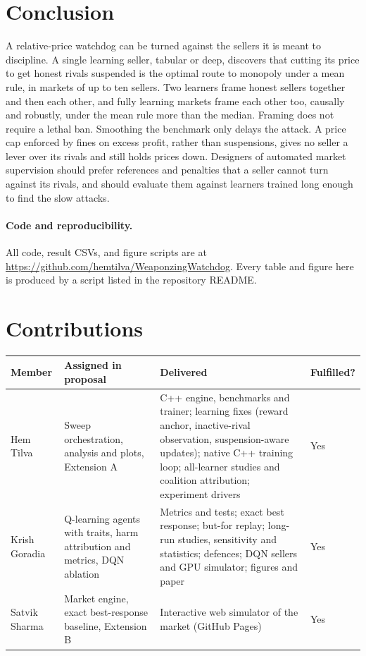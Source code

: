 \documentclass{article}
\begin{document}
\section{Conclusion}
A relative-price watchdog can be turned against the sellers it is meant to discipline. A single learning seller, tabular or deep, discovers that cutting its price to get honest rivals suspended is the optimal route to monopoly under a mean rule, in markets of up to ten sellers. Two learners frame honest sellers together and then each other, and fully learning markets frame each other too, causally and robustly, under the mean rule more than the median. Framing does not require a lethal ban. Smoothing the benchmark only delays the attack. A price cap enforced by fines on excess profit, rather than suspensions, gives no seller a lever over its rivals and still holds prices down. Designers of automated market supervision should prefer references and penalties that a seller cannot turn against its rivals, and should evaluate them against learners trained long enough to find the slow attacks.

\paragraph{Code and reproducibility.} All code, result CSVs, and figure scripts are at \url{https://github.com/hemtilva/WeaponzingWatchdog}. Every table and figure here is produced by a script listed in the repository README.

\section*{Contributions}

\begin{table}[h]
\centering
\small
\begin{tabularx}{\linewidth}{@{}lXXl@{}}
\toprule
Member & Assigned in proposal & Delivered & Fulfilled? \\
\midrule
Hem Tilva & Sweep orchestration, analysis and plots, Extension A & C++ engine, benchmarks and trainer; learning fixes (reward anchor, inactive-rival observation, suspension-aware updates); native C++ training loop; all-learner studies and coalition attribution; experiment drivers & Yes \\
Krish Goradia & Q-learning agents with traits, harm attribution and metrics, DQN ablation & Metrics and tests; exact best response; but-for replay; long-run studies, sensitivity and statistics; defences; DQN sellers and GPU simulator; figures and paper & Yes \\
Satvik Sharma & Market engine, exact best-response baseline, Extension B & Interactive web simulator of the market (GitHub Pages) & Yes \\
\bottomrule
\end{tabularx}
\end{table}



\end{document}
